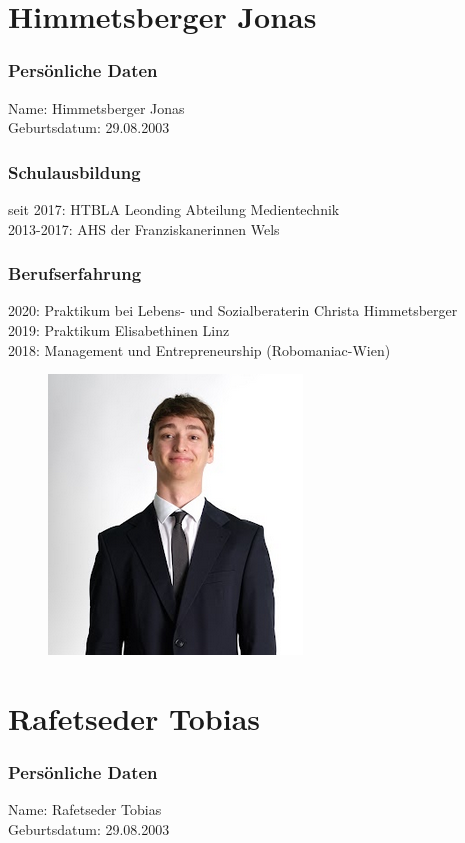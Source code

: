 
\section{Himmetsberger Jonas}
\subsubsection{Persönliche Daten}
Name: Himmetsberger Jonas \\
Geburtsdatum: 29.08.2003
\subsubsection{Schulausbildung}
seit 2017: HTBLA Leonding Abteilung Medientechnik \\
2013-2017: AHS der Franziskanerinnen Wels
\subsubsection{Berufserfahrung}
2020: Praktikum bei Lebens- und Sozialberaterin Christa Himmetsberger \\
2019: Praktikum Elisabethinen Linz \\
2018: Management und Entrepreneurship (Robomaniac-Wien)
\begin{figure}[H]
    \includegraphics[scale=0.6]{pics/jonas.png}
\end{figure}

\section{Rafetseder Tobias}
\subsubsection{Persönliche Daten}
Name: Rafetseder Tobias \\
Geburtsdatum: 29.08.2003
